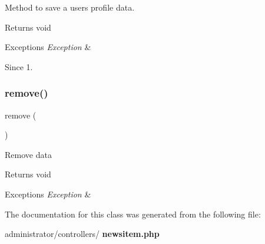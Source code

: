 Method to save a user\textquotesingle{}s profile data.

\begin{DoxyReturn}{Returns}
void
\end{DoxyReturn}

\begin{DoxyExceptions}{Exceptions}
{\em Exception} & \\
\hline
\end{DoxyExceptions}
\begin{DoxySince}{Since}
1. 
\end{DoxySince}
\mbox{\label{classtks__agenda_controller_newsitem_aff9a1fb07dca963c2c9a8ffe66b45ded}} 
\subsubsection{remove()}
{\footnotesize\ttfamily remove (\begin{DoxyParamCaption}{ }\end{DoxyParamCaption})}

Remove data

\begin{DoxyReturn}{Returns}
void
\end{DoxyReturn}

\begin{DoxyExceptions}{Exceptions}
{\em Exception} & \\
\hline
\end{DoxyExceptions}


The documentation for this class was generated from the following file\+:\begin{DoxyCompactItemize}
\item 
administrator/controllers/\textbf{ newsitem.\+php}\end{DoxyCompactItemize}
